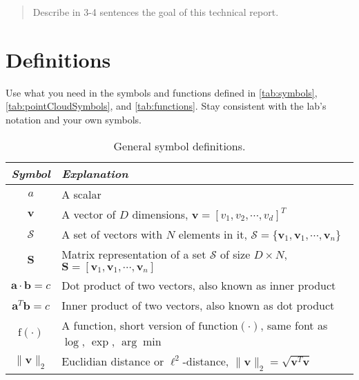 \documentclass[10pt,letterpaper,oneside]{article}
\begin{document}
\makeCustomTitle
\thispagestyle{titlePage}

\begin{abstract}
Describe in 3-4 sentences the goal of this technical report.
\lightlipsum[1]
\end{abstract}

\section{Definitions}

Use what you need in the symbols and functions defined in \autoref{tab:symbols}, \autoref{tab:pointCloudSymbols}, and \autoref{tab:functions}.
Stay consistent with the lab's notation and your own symbols.

\begin{table}[htbp]
\centering
\caption{General symbol definitions.}
\label{tab:symbols}
\begin{tabu}{cX}

\toprule
\emph{Symbol} & \emph{Explanation} \\

\midrule
$a$ & A scalar \\
$\bm{v}$ & A vector of $D$ dimensions, $\bm{v} = [v_1, v_2, \cdots , v_d]^T$ \\
$\mathcal{S}$ & A set of vectors with $N$ elements in it, $\mathcal{S} = \{\bm{v}_1, \bm{v}_1, \cdots, \bm{v}_n\}$\\
$\bm{S}$ & Matrix representation of a set $\mathcal{S}$ of size $D \times N$, $\bm{S} = [\bm{v}_1, \bm{v}_1, \cdots, \bm{v}_n]$\\
$\bm{a} \cdot \bm{b} = c$ & Dot product of two vectors, also known as inner product \\
$\bm{a}^T \bm{b} = c$ & Inner product of two vectors, also known as dot product \\
$\mathrm{f}(\cdot)$ & A function, short version of $\mathrm{function}(\cdot)$, same font as $\log$, $\exp$, $\arg\min$\\
$\|\bm{v}\|_2$ & Euclidian distance or $\ell^2$-distance, $\|\bm{v}\|_2 = \sqrt{\bm{v}^T \bm{v}}$ \\

\bottomrule

\end{tabu}
\end{table}
\end{document}
